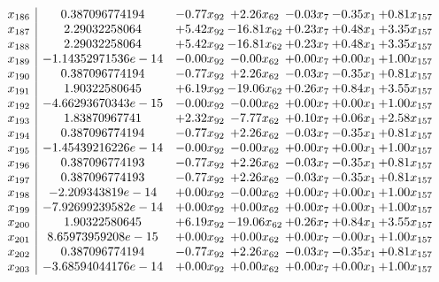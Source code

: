 \documentclass[8pt]{article}
\begin{document}
\[\begin{array}{c| c c@{\hskip 2pt} c@{\hskip 2pt} c@{\hskip 2pt} c@{\hskip 2pt} c@{\hskip 2pt} }
 x_{186}   &  0.387096774194 & -0.77 x_{92} & +  2.26 x_{62} & -0.03 x_{7} & -0.35 x_{1} & +  0.81 x_{157}\\
 x_{187}   &  2.29032258064 & +  5.42 x_{92} & -16.81 x_{62} & +  0.23 x_{7} & +  0.48 x_{1} & +  3.35 x_{157}\\
 x_{188}   &  2.29032258064 & +  5.42 x_{92} & -16.81 x_{62} & +  0.23 x_{7} & +  0.48 x_{1} & +  3.35 x_{157}\\
 x_{189}   &  -1.14352971536e-14 & -0.00 x_{92} & -0.00 x_{62} & +  0.00 x_{7} & +  0.00 x_{1} & +  1.00 x_{157}\\
 x_{190}   &  0.387096774194 & -0.77 x_{92} & +  2.26 x_{62} & -0.03 x_{7} & -0.35 x_{1} & +  0.81 x_{157}\\
 x_{191}   &  1.90322580645 & +  6.19 x_{92} & -19.06 x_{62} & +  0.26 x_{7} & +  0.84 x_{1} & +  3.55 x_{157}\\
 x_{192}   &  -4.66293670343e-15 & -0.00 x_{92} & -0.00 x_{62} & +  0.00 x_{7} & +  0.00 x_{1} & +  1.00 x_{157}\\
 x_{193}   &  1.83870967741 & +  2.32 x_{92} & -7.77 x_{62} & +  0.10 x_{7} & +  0.06 x_{1} & +  2.58 x_{157}\\
 x_{194}   &  0.387096774194 & -0.77 x_{92} & +  2.26 x_{62} & -0.03 x_{7} & -0.35 x_{1} & +  0.81 x_{157}\\
 x_{195}   &  -1.45439216226e-14 & -0.00 x_{92} & -0.00 x_{62} & +  0.00 x_{7} & +  0.00 x_{1} & +  1.00 x_{157}\\
 x_{196}   &  0.387096774193 & -0.77 x_{92} & +  2.26 x_{62} & -0.03 x_{7} & -0.35 x_{1} & +  0.81 x_{157}\\
 x_{197}   &  0.387096774193 & -0.77 x_{92} & +  2.26 x_{62} & -0.03 x_{7} & -0.35 x_{1} & +  0.81 x_{157}\\
 x_{198}   &  -2.209343819e-14 & +  0.00 x_{92} & -0.00 x_{62} & +  0.00 x_{7} & +  0.00 x_{1} & +  1.00 x_{157}\\
 x_{199}   &  -7.92699239582e-14 & +  0.00 x_{92} & +  0.00 x_{62} & +  0.00 x_{7} & +  0.00 x_{1} & +  1.00 x_{157}\\
 x_{200}   &  1.90322580645 & +  6.19 x_{92} & -19.06 x_{62} & +  0.26 x_{7} & +  0.84 x_{1} & +  3.55 x_{157}\\
 x_{201}   &  8.65973959208e-15 & +  0.00 x_{92} & +  0.00 x_{62} & +  0.00 x_{7} & -0.00 x_{1} & +  1.00 x_{157}\\
 x_{202}   &  0.387096774194 & -0.77 x_{92} & +  2.26 x_{62} & -0.03 x_{7} & -0.35 x_{1} & +  0.81 x_{157}\\
 x_{203}   &  -3.68594044176e-14 & +  0.00 x_{92} & +  0.00 x_{62} & +  0.00 x_{7} & +  0.00 x_{1} & +  1.00 x_{157}\\

\end{array}\]
\end{document}
